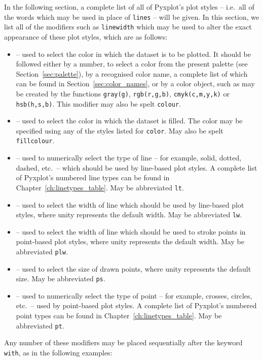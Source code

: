 In the following section, a complete list of all of Pyxplot's plot styles --
i.e.\ all of the words which may be used in place of {\tt lines} -- will be
given. In this section, we list all of the modifiers such as {\tt line\-width}
which may be used to alter the exact appearance of these plot styles, which are
as follows:
\begin{itemize}
\item {} -- used to select the color in which the dataset is to be plotted. It should be followed either by a number, to select a color from the present palette (see Section~\ref{sec:palette}), by a recognised color name, a complete list of which can be found in Section~\ref{sec:color_names}, or by a color object, such as may be created by the functions {\tt gray(g)}, {\tt rgb(r,g,b)}, {\tt cmyk(c,m,y,k)} or {\tt hsb(h,s,b)}. This modifier may also be spelt {\tt colour}.
\item {} -- used to select the color in which the dataset is filled. The color may be specified using any of the styles listed for {\tt color}. May also be spelt {\tt fillcolour}.
\item {} -- used to numerically select the type of line -- for example, solid, dotted, dashed, etc.\ -- which should be used by line-based plot styles. A complete list of Pyxplot's numbered line types can be found in Chapter~\ref{ch:linetypes_table}. May be abbreviated {\tt lt}.
\item {} -- used to select the width of line which should be used by line-based plot styles, where unity represents the default width. May be abbreviated {\tt lw}.
\item {} -- used to select the width of line which should be used to stroke points in point-based plot styles, where unity represents the default width. May be abbreviated {\tt plw}.
\item {} -- used to select the size of drawn points, where unity represents the default size. May be abbreviated {\tt ps}.
\item {} -- used to numerically select the type of point -- for example, crosses, circles, etc.\ -- used by point-based plot styles. A complete list of Pyxplot's numbered point types can be found in Chapter~\ref{ch:linetypes_table}. May be abbreviated {\tt pt}.
\end{itemize}

Any number of these modifiers may be placed sequentially after the keyword {\tt
with}, as in the following examples:

